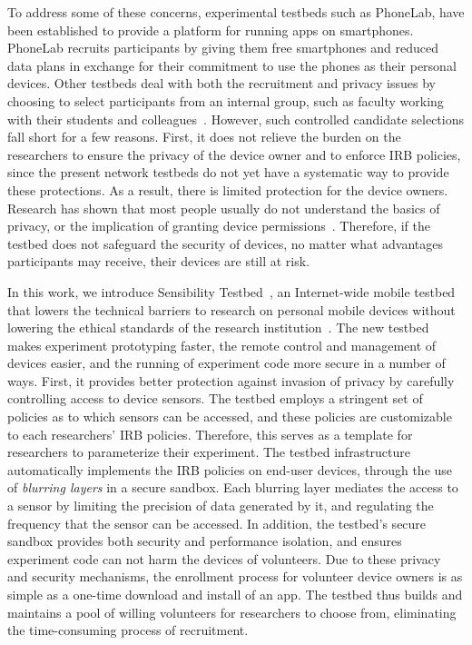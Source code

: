 To address some of these concerns, experimental testbeds such as
PhoneLab, have
been established to provide a platform for running apps on
smartphones. PhoneLab recruits participants by giving them free
smartphones and reduced data plans in exchange for their commitment to
use the phones as their personal devices. 
Other testbeds deal with both
the recruitment and privacy issues by choosing to select participants
from an internal group, such as faculty working with their students
and colleagues~\cite{hao2013isleep, wang2012no, wang2013sensing}. However,
such controlled candidate selections fall short for a few reasons.
First, it does not relieve the burden on the researchers to ensure the privacy of the
device owner and to enforce IRB policies, since the present
network testbeds do not yet have a systematic way to provide these protections. As a result, there is limited protection for the device 
owners. Research has shown that most people usually do not understand 
the basics of privacy, or the implication of granting device
permissions~\cite{camp2015respecting}. Therefore, if the testbed does 
not safeguard the security of devices, no matter what 
advantages participants may receive, their devices are still at risk.

In this work, we introduce Sensibility Testbed~\cite{sensibility,
zhuang2015privacy}, an Internet-wide mobile testbed that 
lowers the technical barriers to research on personal mobile
devices without lowering the ethical standards of the research
institution~\cite{zevenbergen2013ethical}.
The new testbed makes experiment prototyping faster, the remote
control and management of devices easier, and the running of
experiment code more secure in a number of ways. First, 
it provides better protection against invasion of privacy by carefully controlling
access to device sensors. The testbed employs a stringent set of
policies as to which sensors can be accessed, and these
policies are customizable to each researchers' IRB policies. Therefore,  
this serves as a template for researchers to parameterize their 
experiment. The testbed infrastructure automatically implements
the IRB policies on end-user devices, through the use of \textit{blurring 
layers} in a secure sandbox. Each blurring layer mediates the access to 
a sensor by limiting the precision of data generated by it, and 
regulating the frequency that the sensor can be accessed. In addition, 
the testbed's secure sandbox provides both security and performance 
isolation, and ensures experiment code can not harm the devices of 
volunteers. Due to these privacy and security mechanisms, 
the enrollment process for volunteer device owners is as
simple as a one-time download and install of an app. The testbed thus
builds and maintains a pool of willing volunteers for researchers to
choose from, eliminating the time-consuming process of recruitment.


